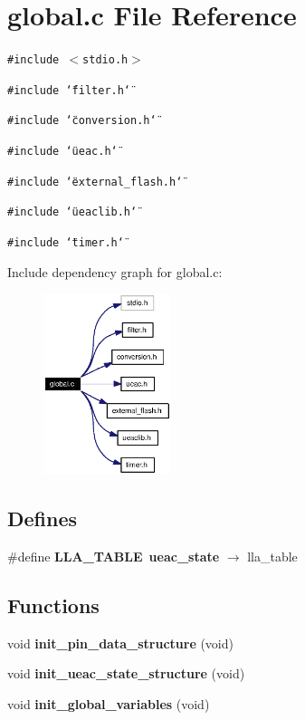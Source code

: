 \section{global.c File Reference}
\label{global_8c}
{\tt \#include $<$stdio.h$>$}\par
{\tt \#include \char`\"{}filter.h\char`\"{}}\par
{\tt \#include \char`\"{}conversion.h\char`\"{}}\par
{\tt \#include \char`\"{}ueac.h\char`\"{}}\par
{\tt \#include \char`\"{}external\_\-flash.h\char`\"{}}\par
{\tt \#include \char`\"{}ueaclib.h\char`\"{}}\par
{\tt \#include \char`\"{}timer.h\char`\"{}}\par


Include dependency graph for global.c:\begin{figure}[H]
\begin{center}
\leavevmode
\includegraphics[width=106pt]{global_8c__incl}
\end{center}
\end{figure}
\subsection*{Defines}
\begin{CompactItemize}
\item 
\#define {\bf LLA\_\-TABLE}~{\bf ueac\_\-state} $\rightarrow$ lla\_\-table
\end{CompactItemize}
\subsection*{Functions}
\begin{CompactItemize}
\item 
void {\bf init\_\-pin\_\-data\_\-structure} (void)
\item 
void {\bf init\_\-ueac\_\-state\_\-structure} (void)
\item 
void {\bf init\_\-global\_\-variables} (void)
\end{CompactItemize}
